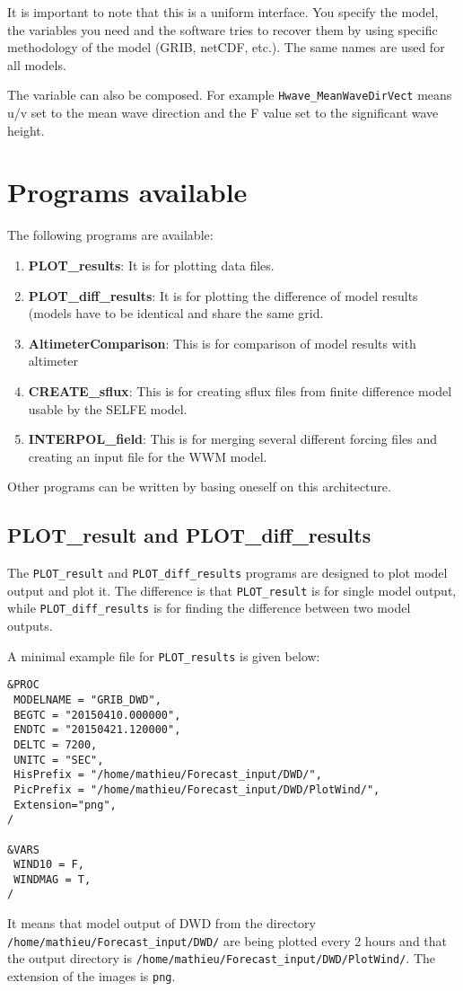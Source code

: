 \documentclass[12pt]{amsart}
\begin{document}
It is important to note that this is a uniform interface.
You specify the model, the variables you need and the software tries
to recover them by using specific methodology of the model (GRIB, netCDF, etc.).
The same names are used for all models.

The variable can also be composed. For example {\tt Hwave\_MeanWaveDirVect} means u/v set to the mean
wave direction and the F value set to the significant wave height.




\section{Programs available}

The following programs are available:
\begin{enumerate}
\item {\bf PLOT\_results}: It is for plotting data files.
\item {\bf PLOT\_diff\_results}: It is for plotting the difference of model results (models have to be identical and share the same grid.
\item {\bf AltimeterComparison}: This is for comparison of model results with altimeter
\item {\bf CREATE\_sflux}: This is for creating sflux files from finite difference model usable by the SELFE model.
\item {\bf INTERPOL\_field}: This is for merging several different forcing files and creating an input file for the WWM model.
\end{enumerate}
Other programs can be written by basing oneself on this architecture.



\subsection{PLOT\_result and PLOT\_diff\_results}

The {\tt PLOT\_result} and {\tt PLOT\_diff\_results} programs are designed to plot model output and plot it. The difference is that {\tt PLOT\_result} is for single model output, while {\tt PLOT\_diff\_results} is for finding the difference between two model outputs.

A minimal example file for {\tt PLOT\_results} is given below:
\begin{verbatim}
&PROC
 MODELNAME = "GRIB_DWD", 
 BEGTC = "20150410.000000",
 ENDTC = "20150421.120000",
 DELTC = 7200, 
 UNITC = "SEC", 
 HisPrefix = "/home/mathieu/Forecast_input/DWD/", 
 PicPrefix = "/home/mathieu/Forecast_input/DWD/PlotWind/", 
 Extension="png",
/

&VARS
 WIND10 = F, 
 WINDMAG = T, 
/
\end{verbatim}
It means that model output of DWD from the directory {\tt /home/mathieu/Forecast\_input/DWD/} are being plotted every 2 hours and that the output directory is {\tt /home/mathieu/Forecast\_input/DWD/PlotWind/}. The extension of the images is {\tt png}.
\end{document}
